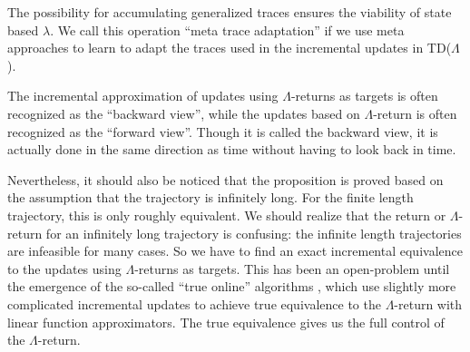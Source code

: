 \documentclass{article}
\begin{document}
\par
The possibility for accumulating generalized traces ensures the viability of state based $\lambda$. We call this operation ``meta trace adaptation'' if we use meta approaches to learn to adapt the traces used in the incremental updates in TD($\Lambda$).
\par
The incremental approximation of updates using $\Lambda$-returns as targets is often recognized as the ``backward view'', while the updates based on $\Lambda$-return is often recognized as the ``forward view''. Though it is called the backward view, it is actually done in the same direction as time without having to look back in time.
\par
Nevertheless, it should also be noticed that the proposition is proved based on the assumption that the trajectory is infinitely long. For the finite length trajectory, this is only roughly equivalent. We should realize that the return or $\Lambda$-return for an infinitely long trajectory is confusing: the infinite length trajectories are infeasible for many cases. So we have to find an exact incremental equivalence to the updates using $\Lambda$-returns as targets. This has been an open-problem until the emergence of the so-called ``true online'' algorithms \cite{seijen2015true}, which use slightly more complicated incremental updates to achieve true equivalence to the $\Lambda$-return with linear function approximators. The true equivalence gives us the full control of the $\Lambda$-return.
\end{document}
